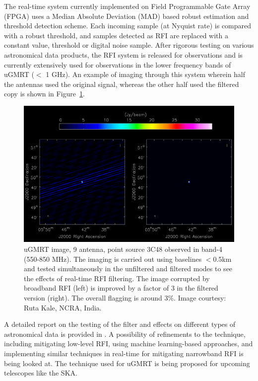 \begin{itemize}
The real-time system currently implemented on Field Programmable Gate Array (FPGA) \citep{buch2019real} uses a Median Absolute Deviation (MAD) based robust estimation and threshold detection scheme. Each incoming sample (at Nyquist rate) is compared with a robust threshold, and samples detected as RFI are replaced with a constant value, threshold or digital noise \citep{buch2014variable} sample. After rigorous testing on various astronomical data products, the RFI system is released for observations and is currently extensively used for observations in the lower frequency bands of uGMRT ($<$ 1 GHz). An example of imaging through this system wherein half the antennas used the original signal, whereas the other half used the filtered copy \citep{buch2022performance} is shown in Figure~\ref{fig:ugmrt-b4-image}. 

\begin{figure}
    \includegraphics[scale=0.4]{Hardware Excision Techniques/figures/band4_point_source_rfi_filtering.png}
    \caption{uGMRT image, 9 antenna, point source 3C48 observed in band-4 (550-850 MHz). The imaging is carried out using baselines $<$0.5km and tested simultaneously in the unfiltered and filtered modes to see the effects of real-time RFI filtering. The image corrupted by broadband RFI (left) is improved by a factor of 3 in the filtered version (right). The overall flagging is around 3\%. Image courtesy: Ruta Kale, NCRA, India.
}
    \label{fig:ugmrt-b4-image}
\end{figure}

A detailed report on the testing of the filter and effects on different types of astronomical data is provided in \citep{kale2025real, lal2025examining}. A possibility of refinements to the technique, including mitigating low-level RFI, using machine learning-based approaches, and implementing similar techniques in real-time for mitigating narrowband RFI \citep{buch2016towards, buch2016real} is being looked at. The technique used for uGMRT is being proposed \citep{buch2023real}for upcoming telescopes like the SKA. %


\end{itemize}
